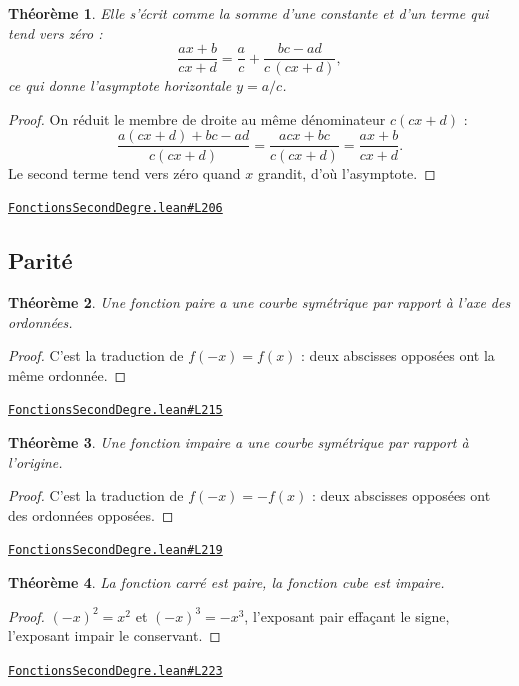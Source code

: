 \documentclass[11pt,a4paper]{article}
\theoremstyle{definition}
\theoremstyle{plain}
\newtheorem{theoreme}{Théorème}
\newcommand{\source}[2]{\par\smallskip\noindent\hfill{\footnotesize\href{#1}{\texttt{#2}}}\par\smallskip}
\begin{document}
\begin{theoreme}
Elle s'écrit comme la somme d'une constante et d'un terme qui tend vers zéro :
\[ \frac{ax+b}{cx+d} = \frac{a}{c} + \frac{bc - ad}{c\,(cx+d)} , \]
ce qui donne l'asymptote horizontale $y = a/c$.
\end{theoreme}

\begin{proof}
On réduit le membre de droite au même dénominateur $c(cx+d)$ :
\[ \frac{a(cx+d) + bc - ad}{c(cx+d)} = \frac{acx + bc}{c(cx+d)} = \frac{ax+b}{cx+d} . \]
Le second terme tend vers zéro quand $x$ grandit, d'où l'asymptote.
\end{proof}
\source{https://github.com/Commutator-IO/learn-lean/blob/main/courses/02-lycee/02-fonctions-second-degre/FonctionsSecondDegre.lean\#L206}{FonctionsSecondDegre.lean\#L206}

\subsection{Parité}

\begin{theoreme}
Une fonction paire a une courbe symétrique par rapport à l'axe des ordonnées.
\end{theoreme}

\begin{proof}
C'est la traduction de $f(-x) = f(x)$ : deux abscisses opposées ont la même
ordonnée.
\end{proof}
\source{https://github.com/Commutator-IO/learn-lean/blob/main/courses/02-lycee/02-fonctions-second-degre/FonctionsSecondDegre.lean\#L215}{FonctionsSecondDegre.lean\#L215}

\begin{theoreme}
Une fonction impaire a une courbe symétrique par rapport à l'origine.
\end{theoreme}

\begin{proof}
C'est la traduction de $f(-x) = -f(x)$ : deux abscisses opposées ont des ordonnées
opposées.
\end{proof}
\source{https://github.com/Commutator-IO/learn-lean/blob/main/courses/02-lycee/02-fonctions-second-degre/FonctionsSecondDegre.lean\#L219}{FonctionsSecondDegre.lean\#L219}

\begin{theoreme}
La fonction carré est paire, la fonction cube est impaire.
\end{theoreme}

\begin{proof}
$(-x)^2 = x^2$ et $(-x)^3 = -x^3$, l'exposant pair effaçant le signe, l'exposant impair
le conservant.
\end{proof}
\source{https://github.com/Commutator-IO/learn-lean/blob/main/courses/02-lycee/02-fonctions-second-degre/FonctionsSecondDegre.lean\#L223}{FonctionsSecondDegre.lean\#L223}
\end{document}
